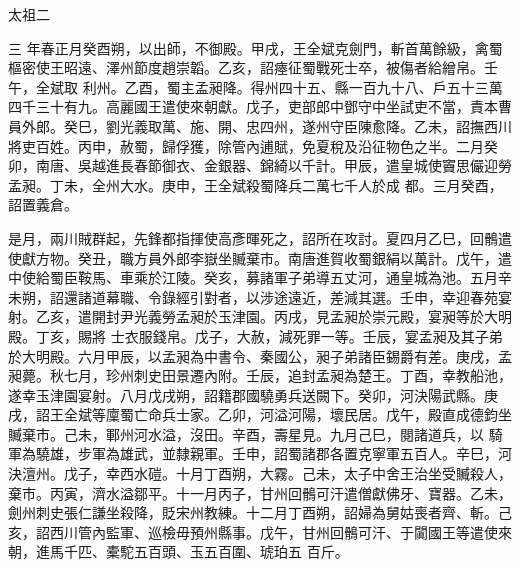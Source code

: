 
\begin{pinyinscope}

 太祖二



 三
 年春正月癸酉朔，以出師，不御殿。甲戌，王全斌克劍門，斬首萬餘級，禽蜀樞密使王昭遠、澤州節度趙崇韜。乙亥，詔瘞征蜀戰死士卒，被傷者給繒帛。壬午，全斌取
 利州。乙酉，蜀主孟昶降。得州四十五、縣一百九十八、戶五十三萬四千三十有九。高麗國王遣使來朝獻。戊子，吏部郎中鄧守中坐試吏不當，責本曹員外郎。癸巳，劉光義取萬、施、開、忠四州，遂州守臣陳愈降。乙未，詔撫西川將吏百姓。丙申，赦蜀，歸俘獲，除管內逋賦，免夏稅及沿征物色之半。二月癸卯，南唐、吳越進長春節御衣、金銀器、錦綺以千計。甲辰，遣皇城使竇思儼迎勞孟昶。丁未，全州大水。庚申，王全斌殺蜀降兵二萬七千人於成
 都。三月癸酉，詔置義倉。



 是月，兩川賊群起，先鋒都指揮使高彥暉死之，詔所在攻討。夏四月乙巳，回鶻遣使獻方物。癸丑，職方員外郎李嶽坐贓棄市。南唐進賀收蜀銀絹以萬計。戊午，遣中使給蜀臣鞍馬、車乘於江陵。癸亥，募諸軍子弟導五丈河，通皇城為池。五月辛未朔，詔還諸道幕職、令錄經引對者，以涉途遠近，差減其選。壬申，幸迎春苑宴射。乙亥，遣開封尹光義勞孟昶於玉津園。丙戌，見孟昶於崇元殿，宴昶等於大明殿。丁亥，賜將
 士衣服錢帛。戊子，大赦，減死罪一等。壬辰，宴孟昶及其子弟於大明殿。六月甲辰，以孟昶為中書令、秦國公，昶子弟諸臣錫爵有差。庚戌，孟昶薨。秋七月，珍州刺史田景遷內附。壬辰，追封孟昶為楚王。丁酉，幸教船池，遂幸玉津園宴射。八月戊戌朔，詔籍郡國驍勇兵送闕下。癸卯，河決陽武縣。庚戌，詔王全斌等廩蜀亡命兵士家。乙卯，河溢河陽，壞民居。戊午，殿直成德鈞坐贓棄市。己未，鄆州河水溢，沒田。辛酉，壽星見。九月己巳，閱諸道兵，以
 騎軍為驍雄，步軍為雄武，並隸親軍。壬申，詔蜀諸郡各置克寧軍五百人。辛巳，河決澶州。戊子，幸西水磑。十月丁酉朔，大霧。己未，太子中舍王治坐受贓殺人，棄市。丙寅，濟水溢鄒平。十一月丙子，甘州回鶻可汗遣僧獻佛牙、寶器。乙未，劍州刺史張仁謙坐殺降，貶宋州教練。十二月丁酉朔，詔婦為舅姑喪者齊、斬。己亥，詔西川管內監軍、巡檢毋預州縣事。戊午，甘州回鶻可汗、于闐國王等遣使來朝，進馬千匹、橐駝五百頭、玉五百圍、琥珀五
 百斤。




\end{pinyinscope}
